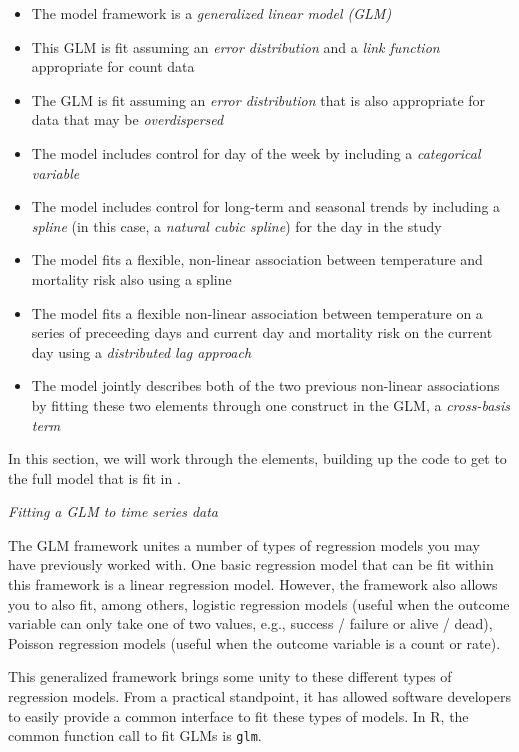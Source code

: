 \documentclass[
]{book}
\providecommand{\tightlist}{%
  \setlength{\itemsep}{0pt}\setlength{\parskip}{0pt}}
\begin{document}
\begin{itemize}
\tightlist
\item
  The model framework is a \emph{generalized linear model (GLM)}
\item
  This GLM is fit assuming an \emph{error distribution} and a \emph{link function}
  appropriate for count data
\item
  The GLM is fit assuming an \emph{error distribution} that is also appropriate for
  data that may be \emph{overdispersed}
\item
  The model includes control for day of the week by including a \emph{categorical
  variable}
\item
  The model includes control for long-term and seasonal trends by including
  a \emph{spline} (in this case, a \emph{natural cubic spline}) for the day in the study
\item
  The model fits a flexible, non-linear association between temperature
  and mortality risk also using a spline
\item
  The model fits a flexible non-linear association between temperature on
  a series of preceeding days and current day and mortality risk on the
  current day using a \emph{distributed lag approach}
\item
  The model jointly describes both of the two previous non-linear associations
  by fitting these two elements through one construct in the GLM, a
  \emph{cross-basis term}
\end{itemize}

In this section, we will work through the elements, building up the code to
get to the full model that is fit in \citet{vicedo2019hands}.

\emph{Fitting a GLM to time series data}

The GLM framework unites a number of types of regression models you may have
previously worked with. One basic regression model that can be fit within this
framework is a linear regression model. However, the framework also allows you
to also fit, among others, logistic regression models (useful when the outcome
variable can only take one of two values, e.g., success / failure or alive /
dead), Poisson regression models (useful when the outcome variable is a count or
rate).

This generalized framework brings some unity to these different types of
regression models. From a practical standpoint, it has allowed software
developers to easily provide a common interface to fit these types of models.
In R, the common function call to fit GLMs is \texttt{glm}.
\end{document}
